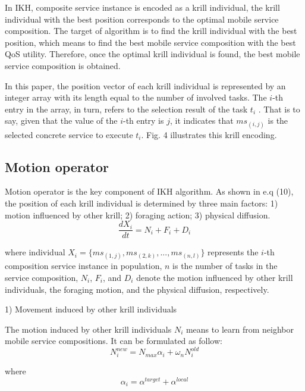 \documentclass[10pt,journal,compsoc]{IEEEtran}
\begin{document}
In IKH, composite service instance is encoded as a krill individual, the krill individual with the best position corresponds to the optimal mobile service composition. The target of algorithm is to find the krill individual with the best position, which means to find the best mobile service composition with the best QoS utility. Therefore, once the optimal krill individual is found, the best mobile service composition is obtained.

In this paper, the position vector of each krill individual is represented by an integer array with its length equal to the number of involved tasks. The $i$-th entry in the array, in turn, refers to the selection result of the task $t_i$ . That is to say, given that the value of the $i$-th entry is $j$, it indicates that $ms_{(i,j)}$ is the selected concrete service to execute $t_i$. Fig. 4 illustrates this krill encoding.



\subsection{Motion operator}
% 
% 

Motion operator is the key component of IKH algorithm. As shown in e.q (10), the position of each krill individual is determined by three main factors: 1) motion influenced by other krill; 2) foraging action; 3) physical diffusion. 
\begin{equation}
\frac{dX_i}{dt} =N_i+F_i+D_i
\end{equation}

where individual $X_i = \{ms_{(1,j)}, ms_{(2,k)}, . . . , ms_{(n,l)}\}$ represents the $i$-th composition service instance in population, $n$ is the number of tasks in the service composition, $N_i$, $F_i$, and $D_i$ denote the motion influenced by other krill individuals, the foraging motion, and the physical diffusion, respectively.

1) Movement induced by other krill individuals

The motion induced by other krill individuals $N_i$ means to learn from neighbor mobile service compositions. It can be formulated as follow:
\begin{equation}
N^{new}_i = N_{max}\alpha_i + \omega_n N^{old}_i
\end{equation}

where
\begin{equation}
\alpha_i = \alpha^{target} + \alpha^{local}
\end{equation}
\end{document}
